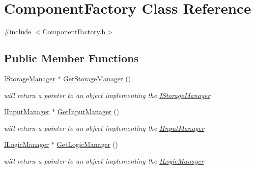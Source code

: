\hypertarget{class_component_factory}{}\section{Component\+Factory Class Reference}
\label{class_component_factory}


{\ttfamily \#include $<$Component\+Factory.\+h$>$}

\subsection*{Public Member Functions}
\begin{DoxyCompactItemize}
\item 
\mbox{\label{class_component_factory_aa6178ddfecc39747ef12f11606735e09}} 
\mbox{\hyperlink{class_i_storage_manager}{I\+Storage\+Manager}} $\ast$ \mbox{\hyperlink{class_component_factory_aa6178ddfecc39747ef12f11606735e09}{Get\+Storage\+Manager}} ()
\begin{DoxyCompactList}\small\item\em will return a pointer to an object implementing the \mbox{\hyperlink{class_i_storage_manager}{I\+Storage\+Manager}} \end{DoxyCompactList}\item 
\mbox{\label{class_component_factory_a84613a5a5f11003abd9d10620ca72b5b}} 
\mbox{\hyperlink{class_i_input_manager}{I\+Input\+Manager}} $\ast$ \mbox{\hyperlink{class_component_factory_a84613a5a5f11003abd9d10620ca72b5b}{Get\+Input\+Manager}} ()
\begin{DoxyCompactList}\small\item\em will return a pointer to an object implementing the \mbox{\hyperlink{class_i_input_manager}{I\+Input\+Manager}} \end{DoxyCompactList}\item 
\mbox{\label{class_component_factory_aa8a3b17c86c562cc69f50f283ed3cc28}} 
\mbox{\hyperlink{class_i_logic_manager}{I\+Logic\+Manager}} $\ast$ \mbox{\hyperlink{class_component_factory_aa8a3b17c86c562cc69f50f283ed3cc28}{Get\+Logic\+Manager}} ()
\begin{DoxyCompactList}\small\item\em will return a pointer to an object implementing the \mbox{\hyperlink{class_i_logic_manager}{I\+Logic\+Manager}} \end{DoxyCompactList}\item 

\end{DoxyCompactItemize}
